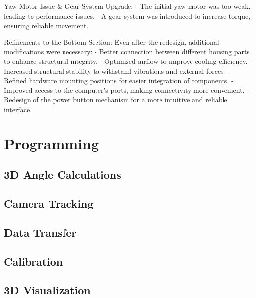 Yaw Motor Issue \& Gear System Upgrade:
- The initial yaw motor was too weak, leading to performance issues.
- A gear system was introduced to increase torque, ensuring reliable movement.

Refinements to the Bottom Section:
Even after the redesign, additional modifications were necessary:
- Better connection between different housing parts to enhance structural integrity.
- Optimized airflow to improve cooling efficiency.
- Increased structural stability to withstand vibrations and external forces.
- Refined hardware mounting positions for easier integration of components.
- Improved access to the computer’s ports, making connectivity more convenient.
- Redesign of the power button mechanism for a more intuitive and reliable interface.


\section{Programming}

\subsection{3D Angle Calculations}

\subsection{Camera Tracking}

\subsection{Data Transfer}

\subsection{Calibration}

\subsection{3D Visualization}
